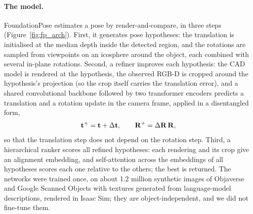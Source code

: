 \paragraph{The model.} FoundationPose estimates a pose by render-and-compare, in three steps
(Figure~\ref{fig:fp_arch}). First, it generates pose hypotheses: the translation is initialised at
the median depth inside the detected region, and the rotations are sampled from viewpoints on an
icosphere around the object, each combined with several in-plane rotations. Second, a refiner
improves each hypothesis: the CAD model is rendered at the hypothesis, the observed RGB-D is cropped
around the hypothesis's projection (so the crop itself carries the translation error), and a shared
convolutional backbone followed by two transformer encoders predicts a translation and a rotation
update in the camera frame, applied in a disentangled form,
\begin{equation}
\mathbf{t}^{+}=\mathbf{t}+\Delta\mathbf{t},\qquad \mathbf{R}^{+}=\Delta\mathbf{R}\,\mathbf{R},
\label{eq:fp_update}
\end{equation}
so that the translation step does not depend on the rotation step. Third, a hierarchical ranker
scores all refined hypotheses: each rendering and its crop give an alignment embedding, and
self-attention across the embeddings of all hypotheses scores each one relative to the others; the
best is returned. The networks were trained once, on about 1.2 million synthetic images of
Objaverse and Google Scanned Objects with textures generated from language-model descriptions,
rendered in Isaac Sim; they are object-independent, and we did not fine-tune them.

